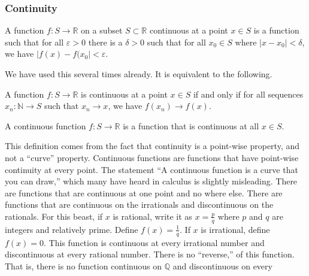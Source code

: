 \documentclass[crop=false,class=article,oneside]{standalone}
\begin{document}
        \subsubsection{Continuity}
            \begin{definition}
                A function $f:S\rightarrow\mathbb{R}$
                on a subset $S\subset\mathbb{R}$ continuous
                at a point $x\in{S}$ is a function such that
                for all $\varepsilon>0$ there is a $\delta>0$
                such that for all $x_{0}\in{S}$ where
                $|x-x_{0}|<\delta$, we have
                $|f(x)-f(x_{0}|<\varepsilon$.
            \end{definition}
            We have used this several times already. It is
            equivalent to the following.
            \begin{theorem}
                A function $f:S\rightarrow\mathbb{R}$
                is continuous at a point $x\in{S}$ if
                and only if for all sequences
                $x_{n}:\mathbb{N}\rightarrow{S}$ such that
                $x_{n}\rightarrow{x}$, we have
                $f(x_{n})\rightarrow{f(x)}$.
            \end{theorem}
            \begin{definition}
                A continuous function $f:S\rightarrow\mathbb{R}$
                is a function that is continuous at all $x\in{S}$.
            \end{definition}
            This definition comes from the fact that
            continuity is a point-wise property, and not a
            ``curve'' property. Continuous functions are
            functions that have point-wise continuity at
            every point. The statement ``A continuous function
            is a curve that you can draw,'' which many have
            heard in calculus is slightly misleading. There
            are functions that are continuous at one point and
            no where else. There are functions that are
            continuous on the irrationals and discontinuous
            on the rationals. For this beast, if $x$ is
            rational, write it as $x=\frac{p}{q}$ where $p$ and
            $q$ are integers and relatively prime. Define
            $f(x)=\frac{1}{q}$. If $x$ is irrational, define
            $f(x)=0$. This function is continuous at every
            irrational number and discontinuous at every
            rational number. There is no ``reverse,'' of this
            function. That is, there is no function continuous
            on $\mathbb{Q}$ and discontinuous on every
\end{document}
